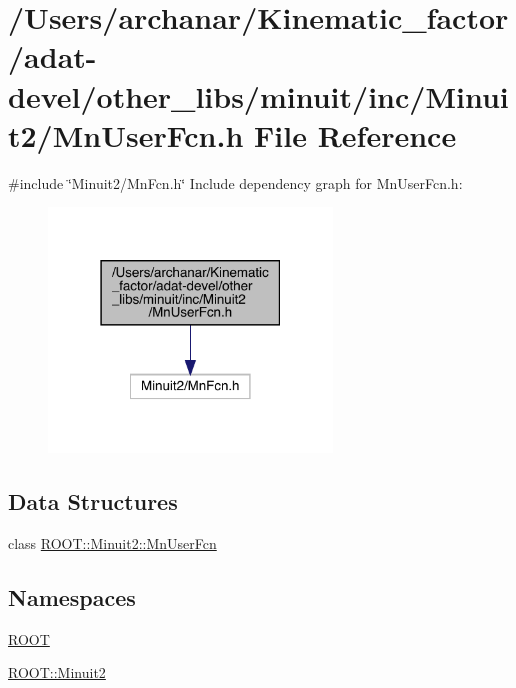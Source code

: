 \hypertarget{adat-devel_2other__libs_2minuit_2inc_2Minuit2_2MnUserFcn_8h}{}\section{/\+Users/archanar/\+Kinematic\+\_\+factor/adat-\/devel/other\+\_\+libs/minuit/inc/\+Minuit2/\+Mn\+User\+Fcn.h File Reference}
\label{adat-devel_2other__libs_2minuit_2inc_2Minuit2_2MnUserFcn_8h}
{\ttfamily \#include \char`\"{}Minuit2/\+Mn\+Fcn.\+h\char`\"{}}\newline
Include dependency graph for Mn\+User\+Fcn.\+h\+:
\nopagebreak
\begin{figure}[H]
\begin{center}
\leavevmode
\includegraphics[width=214pt]{d5/d6d/adat-devel_2other__libs_2minuit_2inc_2Minuit2_2MnUserFcn_8h__incl}
\end{center}
\end{figure}
\subsection*{Data Structures}
\begin{DoxyCompactItemize}
\item 
class \mbox{\hyperlink{classROOT_1_1Minuit2_1_1MnUserFcn}{R\+O\+O\+T\+::\+Minuit2\+::\+Mn\+User\+Fcn}}
\end{DoxyCompactItemize}
\subsection*{Namespaces}
\begin{DoxyCompactItemize}
\item 
 \mbox{\hyperlink{namespaceROOT}{R\+O\+OT}}
\item 
 \mbox{\hyperlink{namespaceROOT_1_1Minuit2}{R\+O\+O\+T\+::\+Minuit2}}
\end{DoxyCompactItemize}
